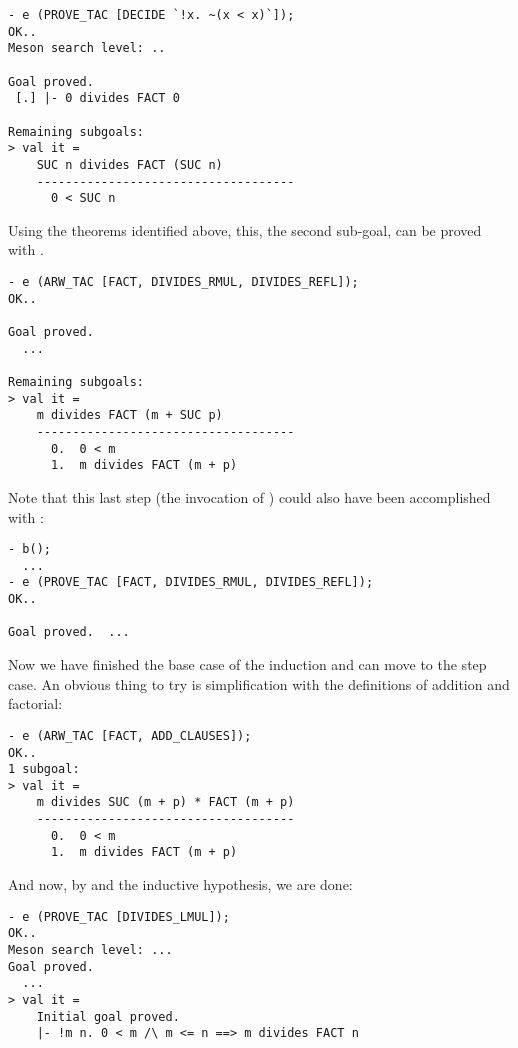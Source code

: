 \begin{session}\begin{verbatim}
- e (PROVE_TAC [DECIDE `!x. ~(x < x)`]);
OK..
Meson search level: ..

Goal proved.
 [.] |- 0 divides FACT 0

Remaining subgoals:
> val it =
    SUC n divides FACT (SUC n)
    ------------------------------------
      0 < SUC n
\end{verbatim}\end{session}
    Using the theorems identified above, this, the second sub-goal, can
    be proved with .

\begin{session}\begin{verbatim}
- e (ARW_TAC [FACT, DIVIDES_RMUL, DIVIDES_REFL]);
OK..

Goal proved.
  ...

Remaining subgoals:
> val it =
    m divides FACT (m + SUC p)
    ------------------------------------
      0.  0 < m
      1.  m divides FACT (m + p)
\end{verbatim}\end{session}
Note that this last step (the invocation of )
could also have been accomplished with :
\begin{session}\begin{verbatim}
- b();
  ...
- e (PROVE_TAC [FACT, DIVIDES_RMUL, DIVIDES_REFL]);
OK..

Goal proved.  ...
\end{verbatim}\end{session}
Now we have finished the base case of the induction and can move to the
step case. An obvious thing to try is simplification with the
definitions of addition and factorial:
\begin{session}\begin{verbatim}
- e (ARW_TAC [FACT, ADD_CLAUSES]);
OK..
1 subgoal:
> val it =
    m divides SUC (m + p) * FACT (m + p)
    ------------------------------------
      0.  0 < m
      1.  m divides FACT (m + p)
\end{verbatim}\end{session}
\noindent And now, by  and the inductive hypothesis, we are
done:
\begin{session}\begin{verbatim}
- e (PROVE_TAC [DIVIDES_LMUL]);
OK..
Meson search level: ...
Goal proved.
  ...
> val it =
    Initial goal proved.
    |- !m n. 0 < m /\ m <= n ==> m divides FACT n
\end{verbatim}\end{session}
